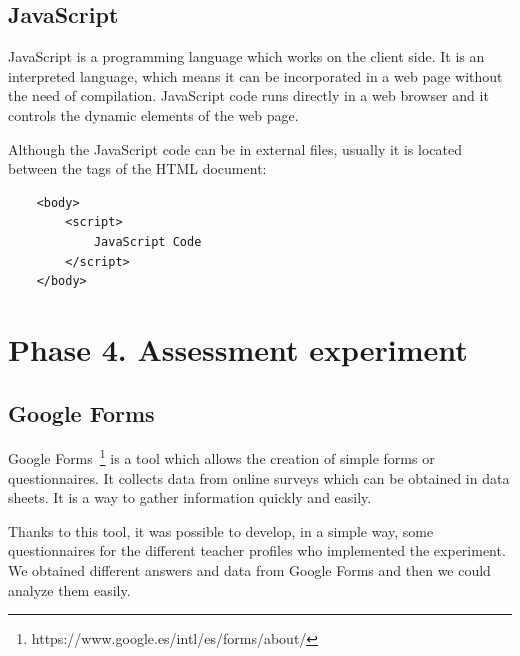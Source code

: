 \subsection{JavaScript}
\label{subsec:javascript}

JavaScript is a programming language which works on the client side. It is an interpreted language, which means it can be incorporated in a web page without the need of compilation. JavaScript code runs directly in a web browser and it controls the dynamic elements of the web page. 

Although the JavaScript code can be in external files, usually it is located between the tags of the HTML document:
{\footnotesize
\begin{verbatim}
    <body>
        <script>
            JavaScript Code
        </script>        
    </body>
\end{verbatim}
}



\section{Phase 4. Assessment experiment}
\label{sec:phase_4}

\subsection{Google Forms}
\label{subsec:google_forms}

Google Forms~\footnote{https://www.google.es/intl/es/forms/about/} is a tool which allows the creation of simple forms or questionnaires. It collects data from online surveys which can be obtained in data sheets. It is a way to gather information quickly and easily.

Thanks to this tool, it was possible to develop, in a simple way, some questionnaires for the different teacher profiles who implemented the experiment. We obtained different answers and data from Google Forms and then we could analyze them easily.


